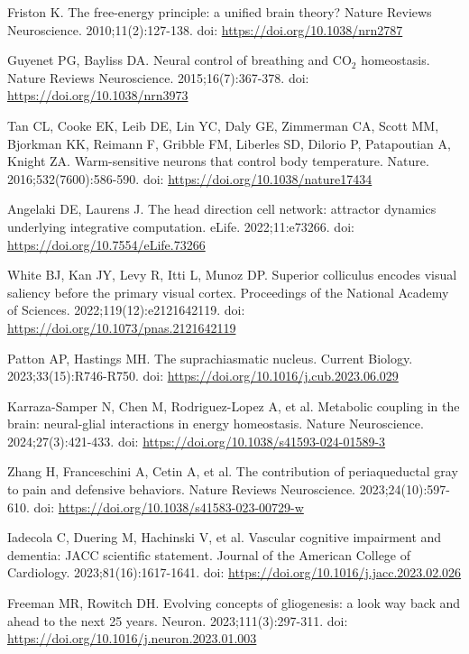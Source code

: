 \documentclass[10pt]{article}
\begin{document}

\begin{thebibliography}{10}
 Friston K. The free-energy principle: a unified brain theory? Nature Reviews Neuroscience. 2010;11(2):127-138. doi: \url{https://doi.org/10.1038/nrn2787}

 Guyenet PG, Bayliss DA. Neural control of breathing and CO$_{2}$ homeostasis. Nature Reviews Neuroscience. 2015;16(7):367-378. doi: \url{https://doi.org/10.1038/nrn3973}

 Tan CL, Cooke EK, Leib DE, Lin YC, Daly GE, Zimmerman CA, Scott MM, Bjorkman KK, Reimann F, Gribble FM, Liberles SD, Dilorio P, Patapoutian A, Knight ZA. Warm-sensitive neurons that control body temperature. Nature. 2016;532(7600):586-590. doi: \url{https://doi.org/10.1038/nature17434}

 Angelaki DE, Laurens J. The head direction cell network: attractor dynamics underlying integrative computation. eLife. 2022;11:e73266. doi: \url{https://doi.org/10.7554/eLife.73266}

 White BJ, Kan JY, Levy R, Itti L, Munoz DP. Superior colliculus encodes visual saliency before the primary visual cortex. Proceedings of the National Academy of Sciences. 2022;119(12):e2121642119. doi: \url{https://doi.org/10.1073/pnas.2121642119}

 Patton AP, Hastings MH. The suprachiasmatic nucleus. Current Biology. 2023;33(15):R746-R750. doi: \url{https://doi.org/10.1016/j.cub.2023.06.029}

 Karraza-Samper N, Chen M, Rodriguez-Lopez A, et al. Metabolic coupling in the brain: neural-glial interactions in energy homeostasis. Nature Neuroscience. 2024;27(3):421-433. doi: \url{https://doi.org/10.1038/s41593-024-01589-3}

 Zhang H, Franceschini A, Cetin A, et al. The contribution of periaqueductal gray to pain and defensive behaviors. Nature Reviews Neuroscience. 2023;24(10):597-610. doi: \url{https://doi.org/10.1038/s41583-023-00729-w}

 Iadecola C, Duering M, Hachinski V, et al. Vascular cognitive impairment and dementia: JACC scientific statement. Journal of the American College of Cardiology. 2023;81(16):1617-1641. doi: \url{https://doi.org/10.1016/j.jacc.2023.02.026}

 Freeman MR, Rowitch DH. Evolving concepts of gliogenesis: a look way back and ahead to the next 25 years. Neuron. 2023;111(3):297-311. doi: \url{https://doi.org/10.1016/j.neuron.2023.01.003}


\end{thebibliography}
\end{document}
